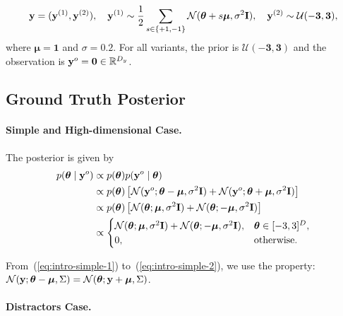 \begin{equation}
  \label{eq:intro-simulator-distractor}
  \mathbf{y} = (\mathbf{y}^{(1)}, \mathbf{y}^{(2)}), \quad
  \mathbf{y}^{(1)} \sim \frac{1}{2} \sum_{s \in \{+1, -1\}} \mathcal{N}(\boldsymbol{\theta} + s\boldsymbol{\mu}, \sigma^2 \mathbf{I}), \quad
  \mathbf{y}^{(2)} \sim \mathcal{U}(-\mathbf{3}, \mathbf{3}),
\end{equation}
where $\boldsymbol{\mu} = \mathbf{1}$ and $\sigma=0.2$.  
%
For all variants, the prior is $\mathcal{U}(-\mathbf{3}, \mathbf{3})$ and the observation is $\mathbf{y}^o = \mathbf{0} \in \mathbb{R}^{D_y}$.

\subsection{Ground Truth Posterior}

\paragraph{Simple and High-dimensional Case.}

The posterior is given by
\begin{align}
  p(\boldsymbol{\theta} \mid \mathbf{y}^o) &\propto p(\boldsymbol{\theta}) p(\mathbf{y}^o \mid \boldsymbol{\theta}) \\
  &\propto p(\boldsymbol{\theta}) \left[ \mathcal{N}(\mathbf{y}^o; \boldsymbol{\theta} - \boldsymbol{\mu}, \sigma^2\mathbf{I}) + \mathcal{N}(\mathbf{y}^o; \boldsymbol{\theta} + \boldsymbol{\mu}, \sigma^2\mathbf{I}) \right] \label{eq:intro-simple-1} \\
  &\propto p(\boldsymbol{\theta}) \left[ \mathcal{N}(\boldsymbol{\theta}; \boldsymbol{\mu}, \sigma^2\mathbf{I}) + \mathcal{N}(\boldsymbol{\theta}; -\boldsymbol{\mu}, \sigma^2\mathbf{I}) \right] \label{eq:intro-simple-2} \\
  &\propto
    \begin{cases}
      \mathcal{N}(\boldsymbol{\theta}; \boldsymbol{\mu}, \sigma^2\mathbf{I}) + \mathcal{N}(\boldsymbol{\theta}; -\boldsymbol{\mu}, \sigma^2\mathbf{I}), & \boldsymbol{\theta} \in [-3, 3]^D, \\
      0, & \text{otherwise}.
    \end{cases}
    \label{eq:intro-simple}
\end{align}

From~(\ref{eq:intro-simple-1}) to~(\ref{eq:intro-simple-2}), we use the property: $\mathcal{N}(\mathbf{y}; \boldsymbol{\theta} - \boldsymbol{\mu}, \Sigma) = \mathcal{N}(\boldsymbol{\theta}; \mathbf{y} + \boldsymbol{\mu} , \Sigma)$.

\paragraph{Distractors Case.}

